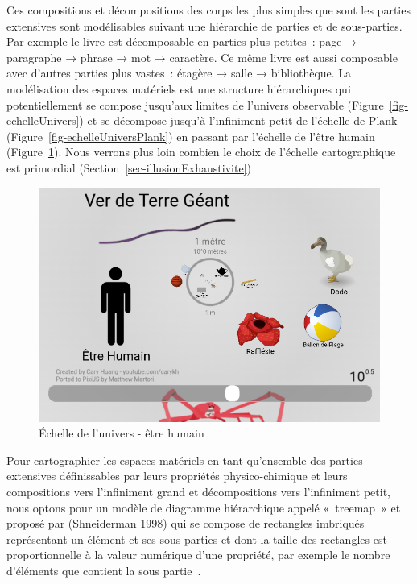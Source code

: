 \documentclass[
  letterpaper,
  DIV=11,
  numbers=noendperiod]{scrreprt}
\begin{document}
Ces compositions et décompositions des corps les plus simples que sont
les parties extensives sont modélisables suivant une hiérarchie de
parties et de sous-parties. Par exemple le livre est décomposable en
parties plus petites~: page → paragraphe → phrase → mot → caractère. Ce
même livre est aussi composable avec d'autres parties plus vastes~:
étagère → salle → bibliothèque. La modélisation des espaces matériels
est une structure hiérarchiques qui potentiellement se compose jusqu'aux
limites de l'univers observable (Figure~\ref{fig-echelleUnivers}) et se
décompose jusqu'à l'infiniment petit de l'échelle de Plank
(Figure~\ref{fig-echelleUniversPlank}) en passant par l'échelle de
l'être humain (Figure~\ref{fig-echelleHumain}). Nous verrons plus loin
combien le choix de l'échelle cartographique est primordial
(Section~\ref{sec-illusionExhaustivite})

\begin{figure}

{\centering \includegraphics{media/100000010000030E00000219C3ED261C6D514C78.png}

}

\caption{\label{fig-echelleHumain}Échelle de l'univers - être humain}

\end{figure}

Pour cartographier les espaces matériels en tant qu'ensemble des parties
extensives définissables par leurs propriétés physico-chimique et leurs
compositions vers l'infiniment grand et décompositions vers l'infiniment
petit, nous optons pour un modèle de diagramme hiérarchique appelé
«~treemap~» et proposé par (Shneiderman 1998) qui se compose de
rectangles imbriqués représentant un élément et ses sous parties et dont
la taille des rectangles est proportionnelle à la valeur numérique d'une
propriété, par exemple le nombre d'éléments que contient la sous
partie~.
\end{document}

